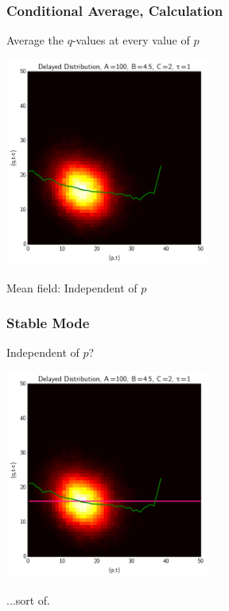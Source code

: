 \documentclass[xcolor={usenames,dvipsnames,svgnames},url=hyphens]{beamer}
\begin{document}
\begin{frame}
    \frametitle{Conditional Average, Calculation}

    Average the $q$-values at every value of $p$


    \begin{center}
        \includegraphics[width=0.5\textwidth]{../results/presentation/ddjd-ca-a100-c2-t1.png}
    \end{center}

    Mean field: Independent of $p$
\end{frame}

\begin{frame}
    \frametitle{Stable Mode}
    Independent of $p$?

    \begin{center}
        \includegraphics[width=0.5\textwidth]{../results/presentation/ddjd-ca-a100-c2-t1-flat.png}
    \end{center}

    ...sort of.

\end{frame}
\end{document}
